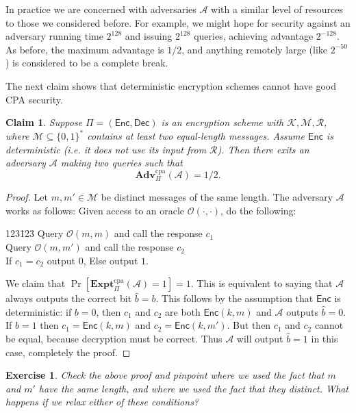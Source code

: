 \documentclass[11pt]{article}
\newtheorem{exercise}{Exercise}
\newtheorem{claim}{Claim}
\newcommand{\msgs}{\mathcal{M}}
\newcommand{\keys}{\mathcal{K}}
\newcommand{\rands}{\mathcal{R}}
\newcommand{\Enc}{\mathsf{Enc}}
\newcommand{\Dec}{\mathsf{Dec}}
\newcommand{\calA}{\mathcal{A}}
\newcommand{\calO}{\mathcal{O}}
\newcommand{\Adv}{\mathbf{Adv}}
\newcommand{\AdvCPA}[2]{\Adv^{\mathrm{cpa}}_{#1}({#2})}
\newcommand{\bits}{\{0,1\}}
\newcommand{\hatb}{\hat{b}}
\newcommand{\ExptCPA}{\mathbf{Expt}^{\mathrm{cpa}}}
\begin{document}
In practice we are concerned with adversaries $\calA$ with a similar level of
resources to those we considered before. For example, we might hope for
security against an adversary running time $2^{128}$ and issuing $2^{128}$
queries, achieving advantage $2^{-128}$. As before, the maximum advantage
is $1/2$, and anything remotely large (like $2^{-50}$) is considered to be
a complete break.

\bigskip

The next claim shows that deterministic encryption schemes cannot have
good CPA security.
\begin{claim}
    Suppose $\Pi=(\Enc,\Dec)$ is an encryption scheme with
    $\keys,\msgs,\rands$, where $\msgs\subseteq\bits^*$ contains at least two 
    equal-length messages. Assume
    $\Enc$ is deterministic (i.e. it does not use its input from $\rands$).
    Then there exits an adversary $\calA$ making two queries such that
    \[
        \AdvCPA{\Pi}{\calA} = 1/2.
    \]
\end{claim}
\begin{proof}
    Let $m,m'\in\msgs$ be distinct messages of the same length. The adversary
    $\calA$ works as follows: Given access to an oracle $\calO(\cdot,\cdot)$,
    do the following:

        \begin{tabbing}
            123\=123\=\kill
            \> Query $\calO(m,m)$ and call the response $c_1$\\
            \> Query $\calO(m,m')$ and call the response $c_2$\\
            \> If $c_1 = c_2$ output $0$, Else output $1$.
        \end{tabbing}

    We claim that $\Pr[\ExptCPA_\Pi(\calA) = 1]=1$. This is equivalent
    to saying that $\calA$ always outputs the correct bit $\hatb=b$.
    This follows by the assumption that $\Enc$ is deterministic:
    if $b=0$, then $c_1$ and $c_2$ are both $\Enc(k,m)$ and $\calA$
    outputs $\hatb=0$. If $b=1$ then $c_1 =\Enc(k,m)$ and $c_2 =\Enc(k,m')$.
    But then $c_1$ and $c_2$ cannot be equal, because decryption
    must be correct. Thus $\calA$ will output $\hatb=1$ in this case,
    completely the proof.
\end{proof}

\begin{exercise}
    Check the above proof and pinpoint where we used the fact that $m$ and $m'$
    have the same length, and where we used the fact that they distinct. What
    happens if we relax either of these conditions?
\end{exercise}
\end{document}
